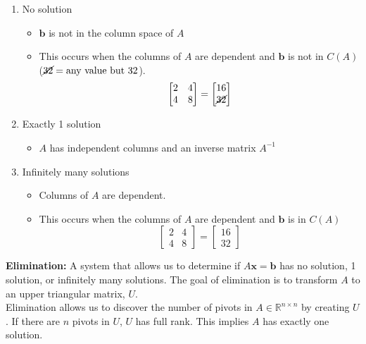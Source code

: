 \documentclass[11pt]{article}
\begin{document}
\begin{enumerate}
    \item No solution
    \begin{itemize}
        \item $\boldsymbol{b}$ is not in the column space of $A$
        \item This occurs when the columns of $A$ are dependent and $\boldsymbol{b}$ is not in
        $C(A)$ ($\cancel{32} = \text{any value but 32}$).
        \[\begin{bmatrix}
            2 & 4\\
            4 & 8
            \end{bmatrix} = \begin{bmatrix}
                16 \\
                \cancel{32}
                \end{bmatrix} \]
    \end{itemize}
    \item Exactly 1 solution
    \begin{itemize}
        \item $A$ has independent columns and an inverse matrix $A^{-1}$
    \end{itemize}
    \item Infinitely many solutions
    \begin{itemize}
        \item Columns of $A$ are dependent.
        \item This occurs when the columns of $A$ are dependent and $\boldsymbol{b}$ is in 
        $C(A)$
        \[\begin{bmatrix}
            2 & 4\\
            4 & 8
            \end{bmatrix} = \begin{bmatrix}
                16 \\
                32
                \end{bmatrix} \]
    \end{itemize}
\end{enumerate}

\textbf{Elimination:} A system that allows us to determine if $A\boldsymbol{x} = \boldsymbol{b}
$ has no solution, 1 solution, or infinitely many solutions. The goal of elimination is to
transform $A$ to an upper triangular matrix, $U$. \\ 

Elimination allows us to discover the number of pivots in $A \in \mathbb{R}^{n \times n}$ by 
creating $U$. If there are $n$ pivots in $U$, $U$ has full rank. This implies $A$ has exactly 
one solution. \\
\end{document}
